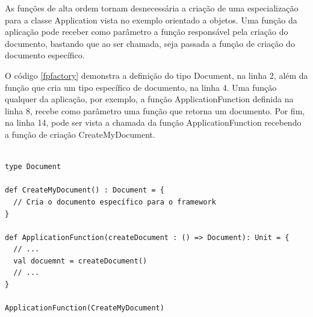 As funções de alta ordem tornam desnecessária 
a criação de uma especialização para a classe 
Application vista no exemplo orientado a 
objetos. Uma função da aplicação pode 
receber como parâmetro a função responsável 
pela criação do documento, bastando que ao 
ser chamada, seja passada a função de criação 
do documento específico. 

O código \ref{fpfactory} demonstra a definição 
do tipo Document, na linha 2, além da função 
que cria um tipo específico de documento, na 
linha 4. Uma função qualquer da aplicação, 
por exemplo, a função ApplicationFunction 
definida na linha 8, recebe como parâmetro 
uma função que retorna um documento. Por 
fim, na linha 14, pode ser vista a chamada 
da função ApplicationFunction recebendo a 
função de criação CreateMyDocument.

\begin{lstlisting}[caption={Factory Method Funcional},label=fpfactory]
    
type Document

def CreateMyDocument() : Document = {
  // Cria o documento específico para o framework
}

def ApplicationFunction(createDocument : () => Document): Unit = {
  // ...
  val docuemnt = createDocument()
  // ...
}

ApplicationFunction(CreateMyDocument)

\end{lstlisting}

